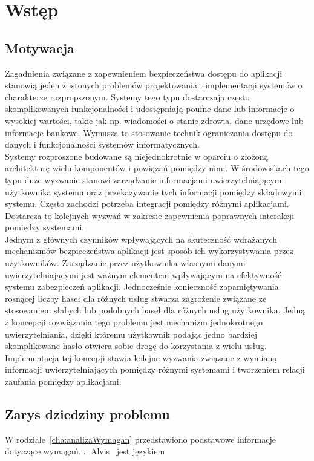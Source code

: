 \chapter{Wstęp}
\label{cha:wstep}


\section{Motywacja}
\label{sec:motywacja}

Zagadnienia związane z zapewnieniem bezpieczeństwa dostępu do aplikacji stanowią jeden z istonych problemów projektowania i implementacji systemów o charakterze rozpropszonym. Systemy tego typu dostarczają często skomplikowanych funkcjonalności i udostępniają poufne dane lub informacje o wysokiej wartości, takie jak np. wiadomości o stanie zdrowia, dane urzędowe lub informacje bankowe. Wymusza to stosowanie technik ograniczania dostępu do danych i funkcjonalności systemów informatycznych.
\\
\indent
Systemy rozproszone budowane są niejednokrotnie w oparciu o złożoną architekturę wielu komponentów i powiązań pomiędzy nimi. W środowiskach tego typu duże wyzwanie stanowi zarządzanie informacjami uwierzytelniającymi użytkownika systemu oraz przekazywanie tych informacji pomiędzy składowymi systemu. Często zachodzi potrzeba integracji pomiędzy różnymi aplikacjami. Dostarcza to kolejnych wyzwań w zakresie zapewnienia poprawnych interakcji pomiędzy systemami.
\\
\indent
Jednym z głównych czynników wpływających na skuteczność wdrażanych mechanizmów bezpieczeństwa aplikacji jest sposób ich wykorzystywania przez użytkowników. Zarządzanie przez użytkownika własnymi danymi uwierzytelniającymi jest ważnym elementem wpływającym na efektywność systemu zabezpieczeń aplikacji. Jednocześnie konieczność zapamiętywania rosnącej liczby haseł dla różnych usług stwarza zagrożenie związane ze stosowaniem słabych lub podobnych haseł dla różnych usług użytkownika. Jedną z koncepcji rozwiązania tego problemu jest mechanizm jednokrotnego uwierzytelniania, dzięki któremu użytkownik podając jedno bardziej skomplikowane hasło otwiera sobie drogę do korzystania z wielu usług. Implementacja tej koncepji stawia kolejne wyzwania związane z wymianą informacji uwierzytelniających pomiędzy różnymi systemami i tworzeniem relacji zaufania pomiędzy  aplikacjami.


\section{Zarys dziedziny problemu}
\label{sec:zarysDziedzinyProblemu}

W rodziale~\ref{cha:analizaWymagan} przedstawiono podstawowe informacje dotyczące wymagań.... Alvis~\cite{Alvis2011} jest językiem 


















